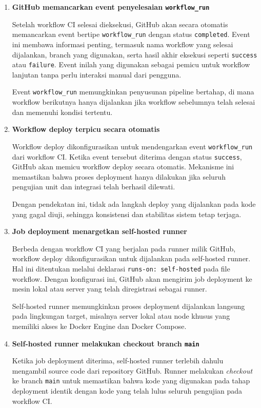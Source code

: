 \begin{enumerate}
  \item \textbf{GitHub memancarkan event penyelesaian \texttt{workflow\_run}}

Setelah workflow CI selesai dieksekusi, GitHub akan secara otomatis
memancarkan event bertipe \texttt{workflow\_run} dengan status
\texttt{completed}. Event ini membawa informasi penting, termasuk nama
workflow yang selesai dijalankan, branch yang digunakan, serta hasil akhir
eksekusi seperti \texttt{success} atau \texttt{failure}. Event inilah yang
digunakan sebagai pemicu untuk workflow lanjutan tanpa perlu interaksi
manual dari pengguna.

Event \texttt{workflow\_run} memungkinkan penyusunan pipeline bertahap,
di mana workflow berikutnya hanya dijalankan jika workflow sebelumnya
telah selesai dan memenuhi kondisi tertentu.

\item \textbf{Workflow deploy terpicu secara otomatis}

Workflow deploy dikonfigurasikan untuk mendengarkan event
\texttt{workflow\_run} dari workflow CI. Ketika event tersebut diterima
dengan status \texttt{success}, GitHub akan memicu workflow deploy secara
otomatis. Mekanisme ini memastikan bahwa proses deployment hanya dilakukan
jika seluruh pengujian unit dan integrasi telah berhasil dilewati.

Dengan pendekatan ini, tidak ada langkah deploy yang dijalankan pada kode
yang gagal diuji, sehingga konsistensi dan stabilitas sistem tetap terjaga.

\item \textbf{Job deployment menargetkan self-hosted runner}

Berbeda dengan workflow CI yang berjalan pada runner milik GitHub,
workflow deploy dikonfigurasikan untuk dijalankan pada self-hosted runner.
Hal ini ditentukan melalui deklarasi \texttt{runs-on: self-hosted} pada
file workflow. Dengan konfigurasi ini, GitHub akan mengirim job deployment
ke mesin lokal atau server yang telah diregistrasi sebagai runner.

Self-hosted runner memungkinkan proses deployment dijalankan langsung pada
lingkungan target, misalnya server lokal atau node khusus yang memiliki
akses ke Docker Engine dan Docker Compose.

\item \textbf{Self-hosted runner melakukan checkout branch \texttt{main}}

Ketika job deployment diterima, self-hosted runner terlebih dahulu mengambil
source code dari repository GitHub. Runner melakukan \textit{checkout} ke
branch \texttt{main} untuk memastikan bahwa kode yang digunakan pada tahap
deployment identik dengan kode yang telah lulus seluruh pengujian pada
workflow CI.


\end{enumerate}
